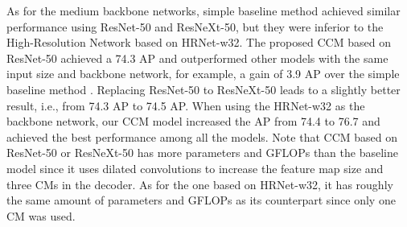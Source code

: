 \documentclass[twocolumn]{svjour3}          \smartqed  \usepackage{natbib}
\begin{document}
As for the medium backbone networks, simple baseline method \citep{xiao2018simple} achieved similar performance using ResNet-50 and ResNeXt-50, but they were inferior to the High-Resolution Network \citep{sun2019deep} based on HRNet-w32. The proposed CCM based on ResNet-50 achieved a 74.3 AP and outperformed other models with the same input size and backbone network, for example, a gain of 3.9 AP over the simple baseline method \citep{xiao2018simple}. Replacing ResNet-50 to ResNeXt-50 leads to a slightly better result, i.e., from 74.3 AP to 74.5 AP. When using the HRNet-w32 as the backbone network, our CCM model increased the AP from 74.4 to 76.7 and achieved the best performance among all the models. Note that CCM based on ResNet-50 or ResNeXt-50 has more parameters and GFLOPs than the baseline model since it uses dilated convolutions to increase the feature map size and three CMs in the decoder. As for the one based on HRNet-w32, it has roughly the same amount of parameters and GFLOPs as its counterpart since only one CM was used.
\end{document}
